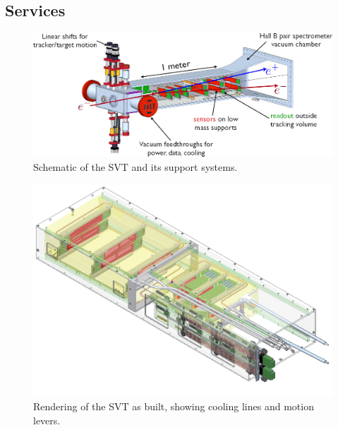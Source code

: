 \subsection{Services}
\label{sec:svt_services}


\begin{figure}[ht]
    \includegraphics[width=\textwidth]{detector/figs/svt_cutaway}
    \caption{Schematic of the SVT and its support systems.}
    \label{fig:svt-schematic}
\end{figure}

\begin{figure}[ht]
    \includegraphics[width=\textwidth]{detector/figs/svt_drawing}
    \caption{Rendering of the SVT as built, showing cooling lines and motion levers.}
    \label{fig:svt-drawing}
\end{figure}

